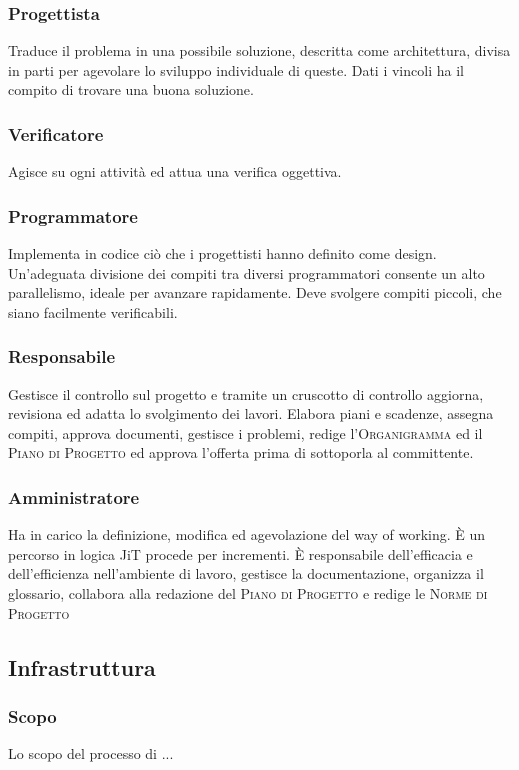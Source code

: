     \subsubsection{Progettista}
        Traduce il problema in una possibile soluzione, descritta come architettura, divisa in parti per agevolare lo sviluppo individuale di queste. Dati i vincoli ha il compito di trovare una buona soluzione.
    \subsubsection{Verificatore}
        Agisce su ogni attività ed attua una verifica oggettiva.
    \subsubsection{Programmatore}
        Implementa in codice ciò che i progettisti hanno definito come design. Un'adeguata divisione dei compiti tra diversi programmatori consente un alto parallelismo, ideale per avanzare rapidamente. Deve svolgere compiti piccoli, che siano facilmente verificabili.
    \subsubsection{Responsabile}
        Gestisce il controllo sul progetto e tramite un cruscotto di controllo aggiorna, revisiona ed adatta lo svolgimento dei lavori. Elabora piani e scadenze, assegna compiti, approva documenti, gestisce i problemi, redige l'\textsc{Organigramma} ed il \textsc{Piano di Progetto} ed approva l'offerta prima di sottoporla al committente.
    \subsubsection{Amministratore}
        Ha in carico la definizione, modifica ed agevolazione del way of working. È un percorso in logica JiT procede per incrementi. È responsabile dell'efficacia e dell'efficienza nell'ambiente di lavoro, gestisce la documentazione, organizza il glossario, collabora alla redazione del \textsc{Piano di Progetto} e redige le \textsc{Norme di Progetto}

\subsection{Infrastruttura} %
    \subsubsection{Scopo}
    Lo scopo del processo di ...
